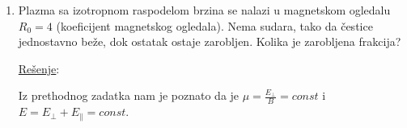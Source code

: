 \documentclass[fleqn]{report}
\begin{document}
\begin{enumerate}
\begin{align*}
               & \frac{dE}{dt} = 0                                                                      \\
               & \frac{dE_\parallel}{dt} + \frac{dE_\perp}{dt} = 0                                      \\
               & -\mu \frac{dB}{dt} + \frac{d}{dt} (\mu B) = 0                                          \\
               & -\cancel{\mu \frac{dB}{dt}} + \frac{d\mu}{dt} B + \cancel{\mu \frac{dB}{dt}} = 0       \\
               & \frac{d\mu}{dt} = 0 \implies \text{\underline{magnetski moment se ne menja u vremenu}}
          \end{align*}

          \hrulefill
    \item Plazma sa izotropnom raspodelom brzina se nalazi u magnetskom ogledalu $R_0 = 4$ (koeficijent magnetskog ogledala).
          Nema sudara, tako da čestice jednostavno beže, dok ostatak ostaje zarobljen.
          Kolika je zarobljena frakcija?

          \underline{Rešenje}:

          Iz prethodnog zadatka nam je poznato da je $\mu = \frac{E_\perp}{B} = const$ i $E = E_\perp + E_\parallel = const$.


\end{enumerate}
\end{document}
